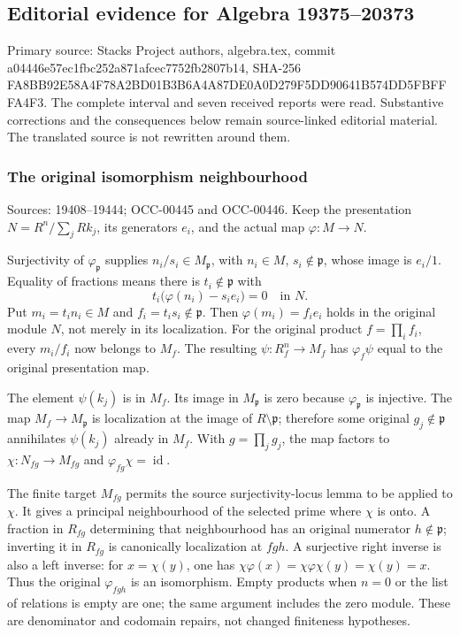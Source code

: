 \subsection{Editorial evidence for Algebra 19375--20373}\label{algebra-proof-010-editorial-evidence-for-algebra-1937520373}

Primary source: Stacks Project authors, algebra.tex, commit a04446e57ec1fbc252a871afcec7752fb2807b14, SHA-256 FA8BB92E58A4F78A2BD01B3B6A4A87DE0A0D279F5DD90641B574DD5FBFFFA4F3. The complete interval and seven received reports were read. Substantive corrections and the consequences below remain source-linked editorial material. The translated source is not rewritten around them.

\subsubsection{The original isomorphism neighbourhood}\label{algebra-proof-010-the-original-isomorphism-neighbourhood}

Sources: 19408--19444; OCC-00445 and OCC-00446. Keep the presentation \(N=R^n/\sum_jRk_j\), its generators \(e_i\), and the actual map \(\varphi:M\to N\).

Surjectivity of \(\varphi_{\mathfrak p}\) supplies \(n_i/s_i\in M_{\mathfrak p}\), with \(n_i\in M\), \(s_i\notin\mathfrak p\), whose image is \(e_i/1\). Equality of fractions means there is \(t_i\notin\mathfrak p\) with \[
t_i\bigl(\varphi(n_i)-s_ie_i\bigr)=0\quad\text{in }N.
\] Put \(m_i=t_in_i\in M\) and \(f_i=t_is_i\notin\mathfrak p\). Then \(\varphi(m_i)=f_ie_i\) holds in the original module \(N\), not merely in its localization. For the original product \(f=\prod_i f_i\), every \(m_i/f_i\) now belongs to \(M_f\). The resulting \(\psi:R_f^n\to M_f\) has \(\varphi_f\psi\) equal to the original presentation map.

The element \(\psi(k_j)\) is in \(M_f\). Its image in \(M_{\mathfrak p}\) is zero because \(\varphi_{\mathfrak p}\) is injective. The map \(M_f\to M_{\mathfrak p}\) is localization at the image of \(R\setminus\mathfrak p\); therefore some original \(g_j\notin\mathfrak p\) annihilates \(\psi(k_j)\) already in \(M_f\). With \(g=\prod_jg_j\), the map factors to \(\chi:N_{fg}\to M_{fg}\) and \(\varphi_{fg}\chi=\operatorname{id}\).

The finite target \(M_{fg}\) permits the source surjectivity-locus lemma to be applied to \(\chi\). It gives a principal neighbourhood of the selected prime where \(\chi\) is onto. A fraction in \(R_{fg}\) determining that neighbourhood has an original numerator \(h\notin\mathfrak p\); inverting it in \(R_{fg}\) is canonically localization at \(fgh\). A surjective right inverse is also a left inverse: for \(x=\chi(y)\), one has \(\chi\varphi(x)=\chi\varphi\chi(y)=\chi(y)=x\). Thus the original \(\varphi_{fgh}\) is an isomorphism. Empty products when \(n=0\) or the list of relations is empty are one; the same argument includes the zero module. These are denominator and codomain repairs, not changed finiteness hypotheses.

